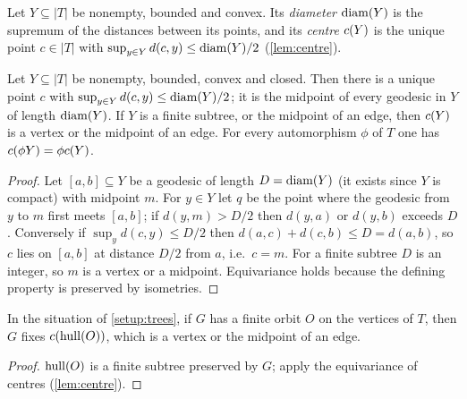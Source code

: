 \begin{definition}[Centre]\label{def:centre}
Let $Y \subseteq |T|$ be nonempty, bounded and convex. Its
\emph{diameter} $\mathrm{diam}(Y)$ is the supremum of the distances between
its points, and its \emph{centre} $c(Y)$ is the unique point
$c \in |T|$ with $\sup_{y \in Y} d(c, y) \leq \mathrm{diam}(Y)/2$
(\cref{lem:centre}).
\end{definition}

\begin{lemma}\label{lem:centre}
Let $Y \subseteq |T|$ be nonempty, bounded, convex and closed. Then there
is a unique point $c$ with $\sup_{y\in Y} d(c,y) \leq \mathrm{diam}(Y)/2$; it is
the midpoint of every geodesic in $Y$ of length $\mathrm{diam}(Y)$. If $Y$ is a
finite subtree, or the midpoint of an edge, then $c(Y)$ is a vertex
or the midpoint of an edge. For every automorphism $\phi$ of $T$ one has
$c(\phi Y) = \phi c(Y)$.
\end{lemma}

\begin{proof}
Let $[a,b] \subseteq Y$ be a geodesic of length $D = \mathrm{diam}(Y)$ (it
exists since $Y$ is compact) with midpoint $m$. For $y \in Y$ let $q$ be
the point where the geodesic from $y$ to $m$ first meets $[a,b]$; if
$d(y,m) > D/2$ then $d(y,a)$ or $d(y,b)$ exceeds $D$. Conversely if
$\sup_{y} d(c, y) \leq D/2$ then $d(a,c) + d(c,b) \leq D = d(a,b)$, so $c$
lies on $[a,b]$ at distance $D/2$ from $a$, i.e.\ $c = m$. For a finite
subtree $D$ is an integer, so $m$ is a vertex or a midpoint. Equivariance
holds because the defining property is preserved by isometries.
\end{proof}

\begin{lemma}\label{lem:finite-orbit}
In the situation of \cref{setup:trees}, if $G$ has a finite orbit $O$ on
the vertices of $T$, then $G$ fixes $c(\mathrm{hull}(O))$, which is a
vertex or the midpoint of an edge.
\end{lemma}

\begin{proof}
$\mathrm{hull}(O)$ is a finite subtree preserved by $G$; apply the
equivariance of centres (\cref{lem:centre}).
\end{proof}


